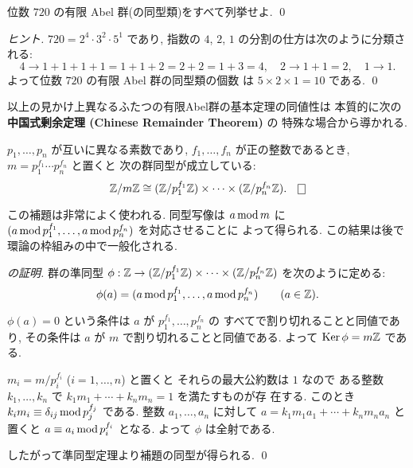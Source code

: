 \documentclass[12pt,twoside]{jarticle}
\begin{document}
\begin{question}
 位数 $720$ の有限 Abel 群(の同型類)をすべて列挙せよ.
 \qed
\end{question}

\begin{proof}[ヒント]
 $720=2^4\cdot 3^2\cdot 5^1$ であり, 
 指数の $4$, $2$, $1$ の分割の仕方は次のように分類される:
 \begin{equation*}
  4 \to 1+1+1+1 = 1+1+2 = 2+2 = 1+3 = 4, \quad
  2 \to 1+1 = 2, \quad 
  1 \to 1.
 \end{equation*}
 よって位数 $720$ の有限 Abel 群の同型類の個数
 は $5\times 2\times 1 = 10$ である.
 \qed
\end{proof}

以上の見かけ上異なるふたつの有限Abel群の基本定理の同値性は
本質的に次の{\bf 中国式剰余定理 (Chinese Remainder Theorem)} の
特殊な場合から導かれる.

\begin{lemma}[中国式剰余定理の特殊な場合]
 \label{lemma:CRT1}
 $p_1,\ldots,p_n$ が互いに異なる素数であり, %
 $f_1,\ldots,f_n$ が正の整数であるとき, 
 $m=p_1^{f_1}\cdots p_n^{f_n}$ と置くと
 次の群同型が成立している:
 \begin{equation*}
  \Z/m\Z \isom
  (\Z/p_1^{f_1}\Z)\times\cdots\times(\Z/p_n^{f_n}\Z).
  \qed
 \end{equation*}
\end{lemma}
この補題は非常によく使われる. 同型写像は $a\mathop{\mathrm{mod}}\nolimits m$ 
に $(a\mathop{\mathrm{mod}}\nolimits p_1^{f_1},\ldots,a\mathop{\mathrm{mod}}\nolimits p_n^{f_n})$ を対応させることに
よって得られる. この結果は後で環論の枠組みの中で一般化される.

\begin{proof}[の証明]
 群の準同型 $\phi:{\mathbb Z}\to({\mathbb Z}/p_1^{f_1}{\mathbb Z})\times\cdots\times({\mathbb Z}/p_n^{f_n}{\mathbb Z})$
 を次のように定める:
\begin{equation*}
 \phi(a)=(a\mathop{\mathrm{mod}}\nolimits p_1^{f_1},\ldots,a\mathop{\mathrm{mod}}\nolimits p_n^{f_n}) \qquad(a\in{\mathbb Z}).
\end{equation*}

 $\phi(a)=0$ という条件は $a$ が $p_1^{f_1},\ldots,p_n^{f_n}$ の
 すべてで割り切れることと同値であり, 
 その条件は $a$ が $m$ で割り切れることと同値である.
 よって $\mathop{\mathrm{Ker}}\nolimits\phi=m{\mathbb Z}$ である.

 $m_i=m/p_i^{f_i}$ ($i=1,\ldots,n$) と置くと
 それらの最大公約数は $1$ なので
 ある整数 $k_1,\ldots,k_n$ で $k_1m_1+\cdots+k_nm_n=1$ を満たすものが存
 在する. このとき $k_im_i\equiv \delta_{ij}\mathop{\mathrm{mod}}\nolimits p_j^{f_j}$ である.
 整数 $a_1,\ldots,a_n$ に対して $a=k_1m_1a_1+\cdots+k_nm_na_n$ と置くと
 $a\equiv a_i \mathop{\mathrm{mod}}\nolimits p_i^{f_i}$ となる.
 よって $\phi$ は全射である.
 
 したがって準同型定理より補題の同型が得られる.
 \qed
\end{proof}
\end{document}
